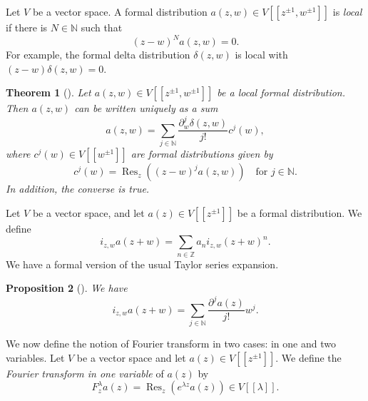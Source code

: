 \documentclass[a4paper, 12pt, reqno]{amsart}
\newtheorem{theorem}{Theorem}[section]
\newtheorem{proposition}[theorem]{Proposition}
\theoremstyle{remark}
\numberwithin{equation}{subsection}
\DeclareMathOperator{\Res}{Res}
\begin{document}
Let $V$ be a vector space.
A formal distribution $a(z, w) \in V[[z^{\pm 1}, w^{\pm 1}]]$ is \emph{local} if there is $N \in \mathbb{N}$ such that
\begin{equation*}
  (z - w)^Na(z, w)=0.
\end{equation*}
For example, the formal delta distribution $\delta(z, w)$ is local with $(z - w)\delta(z, w) = 0$.

\begin{theorem}[{\cite[Proposition 2.2]{kac_vertex_1998}}]
  \label{thr:6}
  Let $a(z, w) \in V[[z^{\pm 1}, w^{\pm 1}]]$ be a local formal distribution.
  Then $a(z, w)$ can be written uniquely as a sum
  \begin{equation*}
    a(z, w) = \sum_{j \in \mathbb{N}}\frac{\partial_w^j\delta(z, w)}{j!}c^j(w),
  \end{equation*}
  where $c^j(w) \in V[[w^{\pm 1}]]$ are formal distributions given by
  \begin{equation*}
    c^j(w) = \Res_z((z - w)^ja(z, w)) \quad \text{for }j \in \mathbb{N}.
  \end{equation*}
  In addition, the converse is true.
\end{theorem}

Let $V$ be a vector space, and let $a(z) \in V[[z^{\pm 1}]]$ be a formal distribution.
We define
\begin{equation*}
  i_{z, w}a(z + w) = \sum_{n \in \mathbb{Z}} a_ni_{z, w}(z + w)^n.
\end{equation*}
We have a formal version of the usual Taylor series expansion.

\begin{proposition}[{\cite[Proposition 3.4.1]{nozaradan_introduction_2008}}]
  \label{prp:1}
  We have
  \begin{equation*}
    i_{z, w}a(z + w) = \sum_{j \in \mathbb{N}}\frac{\partial^ja(z)}{j!}w^j.
  \end{equation*}
\end{proposition}

We now define the notion of Fourier transform in two cases: in one and two variables.
Let $V$ be a vector space and let $a(z) \in V[[z^{\pm 1}]]$.
We define the \emph{Fourier transform in one variable} of $a(z)$ by
\begin{equation*}
  F^{\lambda}_za(z) = \Res_z(e^{\lambda z}a(z)) \in V[[\lambda]].
\end{equation*}
\end{document}
